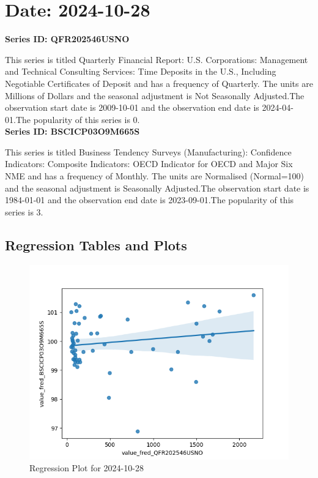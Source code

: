\section{Date: 2024-10-28}
\noindent \textbf{Series ID: QFR202546USNO} 

\noindent This series is titled Quarterly Financial Report: U.S. Corporations: Management and Technical Consulting Services: Time Deposits in the U.S., Including Negotiable Certificates of Deposit and has a frequency of Quarterly. The units are Millions of Dollars and the seasonal adjustment is Not Seasonally Adjusted.The observation start date is 2009-10-01 and the observation end date is 2024-04-01.The popularity of this series is 0. \\ 

\noindent \textbf{Series ID: BSCICP03O9M665S} 

\noindent This series is titled Business Tendency Surveys (Manufacturing): Confidence Indicators: Composite Indicators: OECD Indicator for OECD and Major Six NME and has a frequency of Monthly. The units are Normalised (Normal=100) and the seasonal adjustment is Seasonally Adjusted.The observation start date is 1984-01-01 and the observation end date is 2023-09-01.The popularity of this series is 3. \\ 

\subsection{Regression Tables and Plots}


\begin{figure}
\centering
\includegraphics[scale = 0.9]{plots/plot_2024-10-28.png}
\caption{Regression Plot for 2024-10-28}
\end{figure}
\newpage

